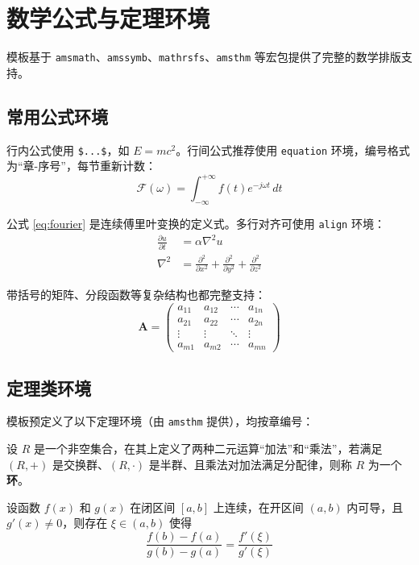 \documentclass{sysu_report}
\begin{document}
\section{数学公式与定理环境}
模板基于 \texttt{amsmath}、\texttt{amssymb}、\texttt{mathrsfs}、\texttt{amsthm} 等宏包提供了完整的数学排版支持。
\subsection{常用公式环境}
行内公式使用 \verb|$...$|，如 $E = mc^2$。行间公式推荐使用 \verb|equation| 环境，编号格式为``章-序号''，每节重新计数：
\begin{equation}
    \mathcal{F}(\omega) = \int_{-\infty}^{+\infty} f(t) e^{-j\omega t} \, dt
    \label{eq:fourier}
\end{equation}\par
公式 \eqref{eq:fourier} 是连续傅里叶变换的定义式。多行对齐可使用 \texttt{align} 环境：
\begin{align}
    \frac{\partial u}{\partial t} &= \alpha \nabla^2 u \label{eq:heat1} \\
    \nabla^2 &= \frac{\partial^2}{\partial x^2} + \frac{\partial^2}{\partial y^2} + \frac{\partial^2}{\partial z^2} \label{eq:laplacian}
\end{align}\par
带括号的矩阵、分段函数等复杂结构也都完整支持：
\begin{equation}
    \mathbf{A} = \begin{pmatrix}
        a_{11} & a_{12} & \cdots & a_{1n} \\
        a_{21} & a_{22} & \cdots & a_{2n} \\
        \vdots & \vdots & \ddots & \vdots \\
        a_{m1} & a_{m2} & \cdots & a_{mn}
    \end{pmatrix}
    \label{eq:matrix}
\end{equation}
\subsection{定理类环境}
模板预定义了以下定理环境（由 \texttt{amsthm} 提供），均按章编号：
\begin{definition}[环]
    设 $R$ 是一个非空集合，在其上定义了两种二元运算``加法''和``乘法''，若满足 $(R,+)$ 是交换群、$(R,\cdot)$ 是半群、且乘法对加法满足分配律，则称 $R$ 为一个\textbf{环}。
    \label{def:ring}
\end{definition}

\begin{thm}[柯西中值定理]
    设函数 $f(x)$ 和 $g(x)$ 在闭区间 $[a,b]$ 上连续，在开区间 $(a,b)$ 内可导，且 $g'(x) \neq 0$，则存在 $\xi \in (a,b)$ 使得
    \begin{equation}
        \frac{f(b) - f(a)}{g(b) - g(a)} = \frac{f'(\xi)}{g'(\xi)}
    \end{equation}
    \label{thm:cauchy}
\end{thm}
\end{document}
